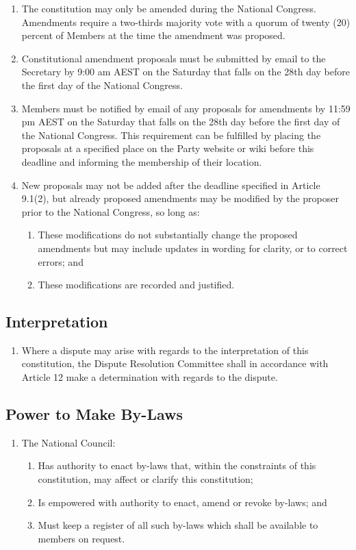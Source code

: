\documentclass[a4paper,titlepage,8.5pt]{article}
\begin{document}
\begin{enumerate}
\item The constitution may only be amended during the National Congress. Amendments require a two-thirds majority vote with a quorum of twenty (20) percent of Members at the time the amendment was proposed.
\item Constitutional amendment proposals must be submitted by email to the Secretary by 9:00 am AEST on the Saturday that falls on the 28th day before the first day of the National Congress.
\item Members must be notified by email of any proposals for amendments by 11:59 pm AEST on the Saturday that falls on the 28th day before the first day of the National Congress. This requirement can be fulfilled by placing the proposals at a specified place on the Party website or wiki before this deadline and informing the membership of their location.
\item New proposals may not be added after the deadline specified in Article 9.1(2), but already proposed amendments may be modified by the proposer prior to the National Congress, so long as:
\begin{enumerate}
  \item These modifications do not substantially change the proposed amendments but may include updates in wording for clarity, or to correct errors; and
  \item These modifications are recorded and justified.
\end{enumerate}

\end{enumerate}

\subsection{Interpretation}

\begin{enumerate}
\item Where a dispute may arise with regards to the interpretation of this constitution, the Dispute Resolution Committee shall in accordance with Article 12 make a determination with regards to the dispute.
\end{enumerate}

\subsection{Power to Make By-Laws}

\begin{enumerate}
\item The National Council:
\begin{enumerate}
\item Has authority to enact by-laws that, within the constraints of this constitution, may affect or clarify this constitution;
\item Is empowered with authority to enact, amend or revoke by-laws; and
\item Must keep a register of all such by-laws which shall be available to members on request.
\end{enumerate}
\end{enumerate}
\end{document}
